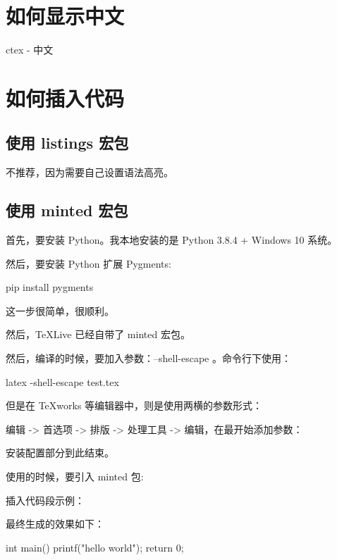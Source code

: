 \documentclass{mynote}
\begin{document}
\section{如何显示中文}

ctex - 中文

\section{如何插入代码}

\subsection{使用 listings 宏包}

不推荐，因为需要自己设置语法高亮。

\subsection{使用 minted 宏包}

首先，要安装 Python。我本地安装的是 Python 3.8.4 + Windows 10 系统。

然后，要安装 Python 扩展 Pygments:

\begin{BashCode}
pip install pygments
\end{BashCode}

这一步很简单，很顺利。

然后，TeXLive 已经自带了 minted 宏包。

然后，编译的时候，要加入参数：--shell-escape 。命令行下使用：

\begin{BashCode}
latex -shell-escape test.tex
\end{BashCode}

但是在 TeXworks 等编辑器中，则是使用两横的参数形式：

编辑 -> 首选项 -> 排版 -> 处理工具 -> 编辑，在最开始添加参数：

安装配置部分到此结束。

使用的时候，要引入 minted 包:

\begin{LatexCode}
\usepackage{minted}
\end{LatexCode}

插入代码段示例：


最终生成的效果如下：

\begin{CCode}
int main() {
    printf("hello world");
    return 0;
}
\end{CCode}
\end{document}
